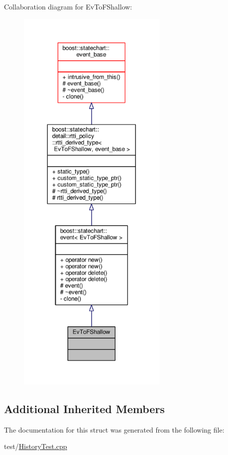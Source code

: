 Collaboration diagram for Ev\+To\+F\+Shallow\+:
\nopagebreak
\begin{figure}[H]
\begin{center}
\leavevmode
\includegraphics[height=550pt]{struct_ev_to_f_shallow__coll__graph}
\end{center}
\end{figure}
\subsection*{Additional Inherited Members}


The documentation for this struct was generated from the following file\+:\begin{DoxyCompactItemize}
\item 
test/\mbox{\hyperlink{_history_test_8cpp}{History\+Test.\+cpp}}\end{DoxyCompactItemize}
